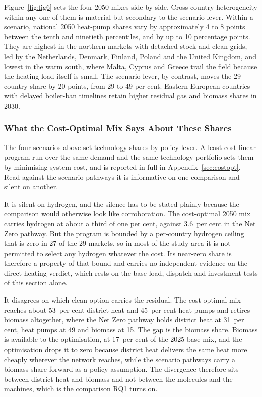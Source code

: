 Figure~\ref{fig:fig6} sets the four 2050 mixes side by side. Cross-country
heterogeneity within any one of them is material but secondary to the scenario lever.
Within a scenario, national 2050 heat-pump shares vary by approximately 4 to 8 points between the tenth and ninetieth percentiles, and by up to 10
percentage points. They are highest in the
northern markets with detached stock and clean grids, led by the Netherlands, Denmark,
Finland, Poland and the United Kingdom, and lowest in the warm south, where Malta,
Cyprus and Greece trail the field because the heating load itself is small. The scenario lever, by
contrast, moves the 29-country share by 20 points, from 29 to 49 per cent. Eastern European
countries with delayed boiler-ban timelines retain higher residual gas and biomass
shares in 2030.

\subsubsection{What the Cost-Optimal Mix Says About These Shares}
\label{sec:results:costoptcompare}

The four scenarios above set technology shares by policy lever. A least-cost linear
program run over the same demand and the same technology portfolio sets them by
minimising system cost, and is reported in full in Appendix~\ref{sec:costopt}. Read
against the scenario pathways it is informative on one comparison and silent on another.

It is silent on hydrogen, and the silence has to be stated plainly because the
comparison would otherwise look like corroboration. The cost-optimal 2050 mix carries
hydrogen at about a third of one per cent, against 3.6~per cent in the Net Zero
pathway. But the program is bounded by a per-country hydrogen ceiling that is zero in
27 of the 29 markets, so in most of the study area it is not permitted to select any
hydrogen whatever the cost. Its near-zero share is therefore a property of that bound
and carries no independent evidence on the direct-heating verdict, which rests on the
base-load, dispatch and investment tests of this section alone.

It disagrees on which clean option carries the residual. The cost-optimal mix reaches
about 53~per cent district heat and 45~per cent heat pumps and retires biomass
altogether, where the Net Zero pathway holds district heat at 31~per cent, heat pumps at
49 and biomass at 15. The gap is the biomass share. Biomass is available to the
optimisation, at 17~per cent of the 2025 base mix, and the optimisation drops it to zero
because district heat delivers the same heat more cheaply wherever the network reaches,
while the scenario pathways carry a biomass share forward as a policy assumption. The
divergence therefore sits between district heat and biomass and not between the
molecules and the machines, which is the comparison RQ1 turns on.



